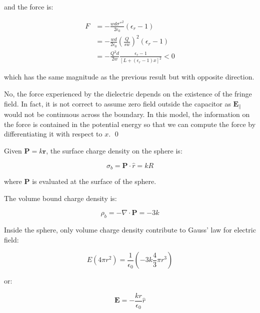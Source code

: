 \documentclass[12pt]{article}
\begin{document}
and the force is:

\begin{equation}
    \begin{split}
        F &= -\frac{wd\sigma''^{2}}{2\epsilon_{0}} (\epsilon_{r} - 1) \\
        &= -\frac{wd}{2\epsilon_{0}} \left( \frac{Q}{sw} \right)^{2} (\epsilon_{r} - 1) \\
        &= -\frac{Q^{2}d}{2w} \frac{\epsilon_{r} - 1}{[L + (\epsilon_{r} - 1)x]^{2}} < 0
    \end{split}
\end{equation}

which has the same magnitude as the previous result but with opposite direction.

No, the force experienced by the dielectric depends on the existence of the fringe field. In fact, it is not correct to assume zero field outside the capacitor as $\mathbf{E}_{\parallel}$ would not be continuous across the boundary. In this model, the information on the force is contained in the potential energy so that we can compute the force by differentiating it with respect to $x$.
\qed



Given $\mathbf{P} = k \mathbf{r}$, the surface charge density on the sphere is:

\begin{equation}
    \sigma_{b} = \mathbf{P} \cdot \hat{r} = kR
\end{equation}

where $\mathbf{P}$ is evaluated at the surface of the sphere.

The volume bound charge density is:

\begin{equation}
    \rho_{b} = -\nabla \cdot \mathbf{P} = -3k
\end{equation}

Inside the sphere, only volume charge density contribute to Gauss' law for electric field:

\begin{equation}
    E (4\pi r^{2}) = \frac{1}{\epsilon_{0}} \left( -3k \frac{4}{3} \pi r^{3} \right)
\end{equation}

or:

\begin{equation}
    \mathbf{E} = -\frac{kr}{\epsilon_{0}} \hat{r}
\end{equation}
\end{document}
